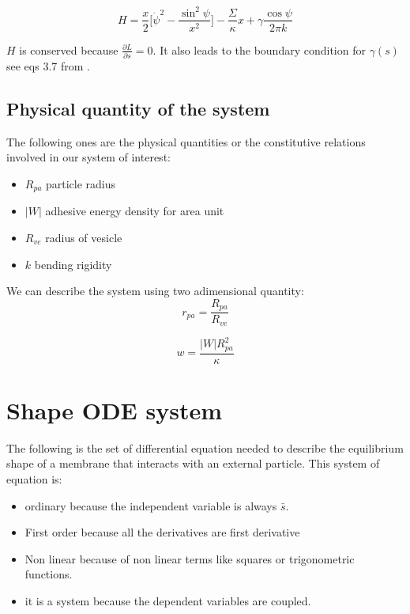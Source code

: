 \documentclass[12pt]{article}
\begin{document}
\begin{equation*}
    H = \frac{x}{2} \bigg[  \dot{\psi}^2 - \frac{\sin^2 \psi}{x^2} \bigg] - \frac{\Sigma}{\kappa} x + \gamma \frac{\cos \psi}{2\pi k}
\end{equation*}



$H$ is conserved because $\frac{\partial L}{\partial s} = 0$. It also leads to the boundary condition for $\gamma(s)$ see eqs 3.7 from \cite{seifertShapeTransformationsVesicles1991}.



\subsection{Physical quantity of the system}
The following ones are the physical quantities or the constitutive relations involved in our system of interest:

\begin{itemize}
  \item $R_{pa}$ particle radius
  \item $|W|$ adhesive energy density for area unit
  \item $R_{ve}$ radius of vesicle
  \item $k$ bending rigidity
\end{itemize}

We can describe the system using two adimensional quantity:
$$
r_{pa} = \frac{R_{pa}}{R_{ve}}
$$

$$
w = \frac{|W| R_{pa}^2}{\kappa}
$$


\section{Shape ODE system}
The following is the set of differential equation needed to describe the equilibrium shape of a membrane that interacts with an external particle. This system of equation is:
\begin{itemize}
    \item ordinary because the independent variable is always $\bar{s}$.
    \item First order because all the derivatives are first derivative
    \item Non linear because of non linear terms like squares or trigonometric functions.
    \item it is a system because the dependent variables are coupled.
\end{itemize}
\end{document}
